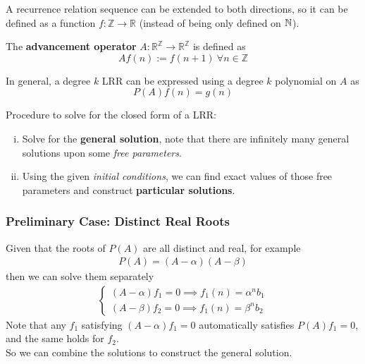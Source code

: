 \documentclass{article}
\def\Z{{\mathbb Z}}
\def\R{{\mathbb R}}
\begin{document}
				\begin{remark}
					A recurrence relation sequence can be extended to both directions, so it can be defined as a function $f: \Z \to \R$ (instead of being only defined on $\mathbb{N}$).
				\end{remark}
				
				\begin{definition}
					The \textbf{advancement operator} $A: \R^{\Z} \to \R^{\Z}$ is defined as
					\begin{equation}
						A f(n) := f(n+1)\ \forall n \in \Z
					\end{equation}
				\end{definition}
				
				\begin{proposition}
					In general, a degree $k$ LRR can be expressed using a degree $k$ polynomial on $A$ as
					\begin{equation}
						P(A) f(n) = g(n)
					\end{equation}
				\end{proposition}
				
				\begin{remark}Procedure to solve for the closed form of a LRR:
					\begin{enumerate}[(i)]
						\item Solve for the \textbf{general solution}, note that there are infinitely many general solutions upon some \emph{free parameters}.
						\item Using the given \emph{initial conditions}, we can find exact values of those free parameters and construct \textbf{particular solutions}.
					\end{enumerate}
				\end{remark}
				
				\subsubsection{Preliminary Case: Distinct Real Roots}
					\begin{remark}
						Given that the roots of $P(A)$ are all distinct and real, for example
						\begin{gather}
							P(A) = (A - \alpha) (A - \beta)
						\end{gather}
						then we can solve them separately
						\begin{gather}
							\begin{cases}
								(A - \alpha) f_1 = 0 \implies f_1(n) = \alpha^n b_1 \\
								(A - \beta) f_2 = 0 \implies f_1(n) = \beta^n b_2
							\end{cases}
						\end{gather}
						Note that any $f_1$ satisfying $(A - \alpha) f_1 = 0$ automatically satisfies $P(A) f_1 = 0$, and the same holds for $f_2$.\\
						So we can combine the solutions to construct the general solution.
					\end{remark}
				
\end{document}
